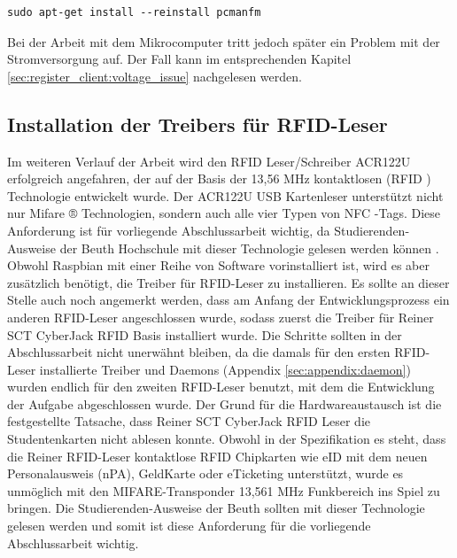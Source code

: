 \begin{lstlisting}[caption={[Boot-Schleife beim Start des der Desktops] },captionpos=b]
sudo apt-get install --reinstall pcmanfm
\end{lstlisting}
Bei der Arbeit mit dem Mikrocomputer tritt jedoch später ein Problem mit der Stromversorgung auf. Der Fall kann im entsprechenden Kapitel \ref{sec:register_client:voltage_issue} nachgelesen werden.


\subsection{Installation der Treibers für RFID-Leser}
\label{sec:register_client:install_rfid}
Im weiteren Verlauf der Arbeit wird den RFID Leser/Schreiber ACR122U erfolgreich angefahren, der auf der Basis der 13,56 MHz kontaktlosen (RFID ) Technologie entwickelt wurde. Der ACR122U USB Kartenleser unterstützt nicht nur Mifare ® Technologien, sondern auch alle vier Typen von NFC -Tags. Diese Anforderung ist für vorliegende Abschlussarbeit wichtig, da Studierenden-Ausweise der Beuth Hochschule mit dieser Technologie gelesen werden können \cite{website:1}. Obwohl Raspbian mit einer Reihe von Software vorinstalliert ist, wird es aber zusätzlich benötigt, die Treiber für RFID-Leser zu installieren. Es sollte an dieser Stelle auch noch angemerkt werden, dass am Anfang der Entwicklungsprozess ein anderen RFID-Leser angeschlossen wurde, sodass zuerst die Treiber für Reiner SCT CyberJack RFID Basis \cite{website:4} installiert wurde. Die Schritte sollten in der Abschlussarbeit nicht unerwähnt bleiben, da die damals für den ersten RFID-Leser installierte Treiber und Daemons (Appendix \ref{sec:appendix:daemon}) wurden endlich für den zweiten RFID-Leser benutzt, mit dem die Entwicklung der Aufgabe abgeschlossen wurde. Der Grund für die Hardwareaustausch ist die festgestellte Tatsache, dass Reiner SCT CyberJack RFID Leser die Studentenkarten nicht ablesen konnte. Obwohl in der Spezifikation es steht, dass die Reiner RFID-Leser kontaktlose RFID Chipkarten wie eID mit dem neuen Personalausweis (nPA), GeldKarte oder eTicketing unterstützt, wurde es unmöglich mit den MIFARE-Transponder 13,561 MHz Funkbereich ins Spiel zu bringen. Die Studierenden-Ausweise der Beuth sollten mit dieser Technologie gelesen werden und somit ist diese Anforderung für die vorliegende Abschlussarbeit wichtig. 

